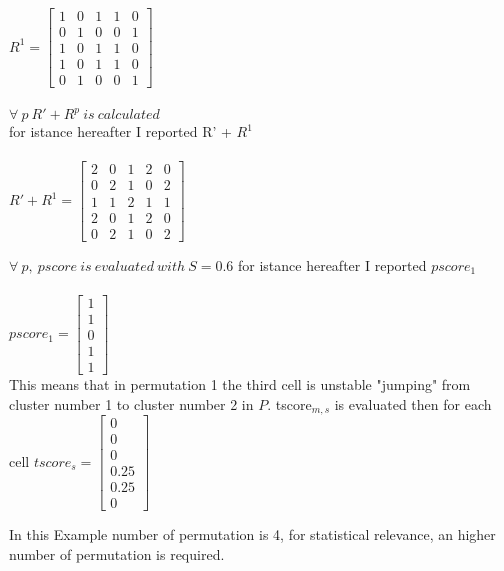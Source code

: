 \documentclass[12pt]{article}
\begin{document}
$ R^1=\begin{bmatrix}
1 & 0 & 1 & 1 & 0 \\
0 & 1 & 0 & 0 & 1 \\
1 & 0 & 1 & 1 & 0 \\
1 & 0 & 1 & 1 & 0 \\
0 & 1 & 0 & 0 & 1 
\end{bmatrix}  $ \\ \\


$ \forall \ p \ R'+R^p \ is \ calculated$ \\ 
for istance hereafter I reported R' + $R^1$ \\ \\


$ R'+R^1=\begin{bmatrix}
2 & 0 & 1 & 2 & 0 \\
0 & 2 & 1 & 0 & 2 \\
1 & 1 & 2 & 1 & 1 \\
2 & 0 & 1 & 2 & 0 \\
0 & 2 & 1 & 0 & 2 
\end{bmatrix}  $ 


$ \forall \ p ,\ pscore \ is \ evaluated \ with \ S=0.6$
for istance hereafter I reported $pscore_1$ \\ \\


$ pscore_1=\begin{bmatrix}
1 \\
1 \\
0 \\
1 \\
1 
\end{bmatrix}  $
\\ This means that in permutation 1 the third cell is unstable "jumping" from cluster number 1 to cluster number 2 in $P$.
tscore$_{m,s}$ is evaluated then for each cell
$ tscore_s=\begin{bmatrix}
0 \\
0 \\
0 \\
0.25 \\
0.25 \\
0 
\end{bmatrix}  $

In this Example number of permutation is 4, for statistical relevance, an higher number of permutation is required. 


\end{document}
